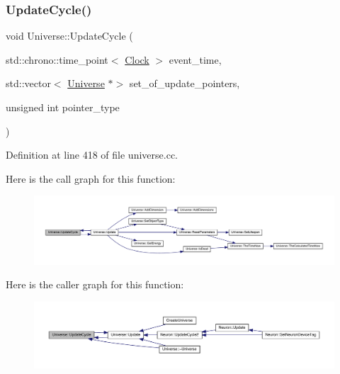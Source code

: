 \subsubsection{\texorpdfstring{Update\+Cycle()}{UpdateCycle()}}
{\footnotesize\ttfamily void Universe\+::\+Update\+Cycle (\begin{DoxyParamCaption}\item[{std\+::chrono\+::time\+\_\+point$<$ \hyperlink{universe_8h_a0ef8d951d1ca5ab3cfaf7ab4c7a6fd80}{Clock} $>$}]{event\+\_\+time,  }\item[{std\+::vector$<$ \hyperlink{class_universe}{Universe} $\ast$$>$}]{set\+\_\+of\+\_\+update\+\_\+pointers,  }\item[{unsigned int}]{pointer\+\_\+type }\end{DoxyParamCaption})}



Definition at line 418 of file universe.\+cc.

Here is the call graph for this function\+:
\nopagebreak
\begin{figure}[H]
\begin{center}
\leavevmode
\includegraphics[width=350pt]{class_universe_a0d79e614e1af951c06b78cb5768f9c8e_cgraph}
\end{center}
\end{figure}
Here is the caller graph for this function\+:
\nopagebreak
\begin{figure}[H]
\begin{center}
\leavevmode
\includegraphics[width=350pt]{class_universe_a0d79e614e1af951c06b78cb5768f9c8e_icgraph}
\end{center}
\end{figure}
\mbox{\label{class_universe_a63e878aaf03f1800b255e9a089a72a8b}} 
